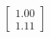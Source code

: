 \documentclass[preview]{standalone}
\begin{document}
\begin{align*}
\begin{bmatrix} 1.00 \\ 1.11 \end{bmatrix}
\end{align*}
\end{document}
